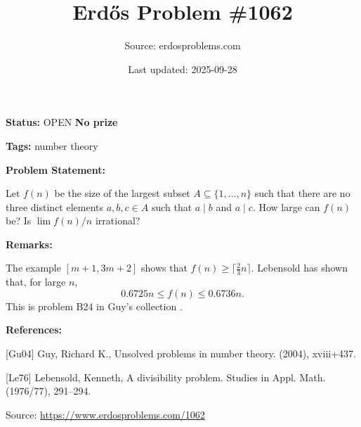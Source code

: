 \documentclass{article}
\title{Erd\H{o}s Problem \#1062}
\date{Last updated: 2025-09-28}
\author{Source: erdosproblems.com}
\begin{document}
\maketitle

\noindent\textbf{Status:} OPEN \quad \textbf{No prize}

\noindent\textbf{Tags:} number theory

\medskip
\noindent\textbf{Problem Statement:}

Let $f(n)$ be the size of the largest subset $A\subseteq \{1,\ldots,n\}$ such that there are no three distinct elements $a,b,c\in A$ such that $a\mid b$ and $a\mid c$. How large can $f(n)$ be? Is $\lim f(n)/n$ irrational?

\bigskip
\noindent\textbf{Remarks:}

The example $[m+1,3m+2]$ shows that $f(n)\geq\lceil \frac{2}{3}n\rceil$. Lebensold \cite{Le76} has shown that, for large $n$,\[0.6725 n \leq f(n) \leq 0.6736 n.\]This is problem B24 in Guy's collection \cite{Gu04}.

\bigskip
\noindent\textbf{References:}

[Gu04] Guy, Richard K., Unsolved problems in number theory. (2004), xviii+437.
 
 [Le76] Lebensold, Kenneth, A divisibility problem. Studies in Appl. Math. (1976/77), 291--294.

\bigskip
\noindent\small{Source: \url{https://www.erdosproblems.com/1062}}
\end{document}
